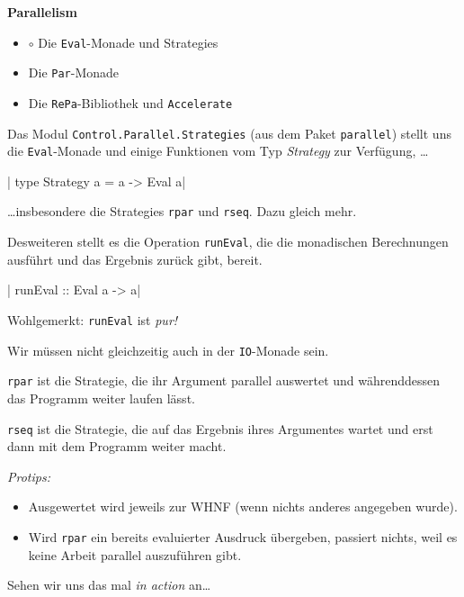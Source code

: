 \documentclass{beamer}
\begin{document}
\begin{frame}[fragile]

\begin{center}
\Large
\textbf{Parallelism}\normalsize\bigskip
\begin{itemize}
\item $\circ$ Die \texttt{Eval}-Monade und Strategies
\item Die \texttt{Par}-Monade
\item Die \texttt{RePa}-Bibliothek und \texttt{Accelerate}
\end{itemize}
\end{center}

\end{frame}


\begin{frame}[fragile]

Das Modul \texttt{Control.Parallel.Strategies} (aus dem Paket \texttt{parallel}) stellt uns
die \texttt{Eval}-Monade und einige Funktionen vom Typ \emph{Strategy} zur Verfügung, \dots\pause

|    type Strategy a = a -> Eval a|
\pause

\dots insbesondere die Strategies \texttt{rpar} und \texttt{rseq}. Dazu gleich mehr.\pause\bigskip

Desweiteren stellt es die Operation \texttt{runEval}, die die monadischen 
Berechnungen ausführt und das Ergebnis zurück gibt, bereit.

|    runEval :: Eval a -> a|
\pause
\bigskip

Wohlgemerkt: \texttt{runEval} ist \emph{pur!}

Wir müssen nicht gleichzeitig auch in der \texttt{IO}-Monade sein.

\end{frame}


\begin{frame}[fragile]
\texttt{rpar} ist die Strategie, die ihr Argument parallel auswertet und währenddessen das Programm weiter laufen lässt.
\bigskip\pause

\texttt{rseq} ist die Strategie, die auf das Ergebnis ihres Argumentes wartet und erst dann mit dem Programm weiter macht.
\bigskip\pause

\emph{Protips:}\pause
\begin{itemize}
\item Ausgewertet wird jeweils zur WHNF (wenn nichts anderes angegeben wurde).\pause
\item Wird \texttt{rpar} ein bereits evaluierter Ausdruck übergeben, passiert nichts,
weil es keine Arbeit parallel auszuführen gibt. \pause
\end{itemize}
\bigskip

Sehen wir uns das mal \emph{in action} an\dots
\end{frame}
\end{document}
